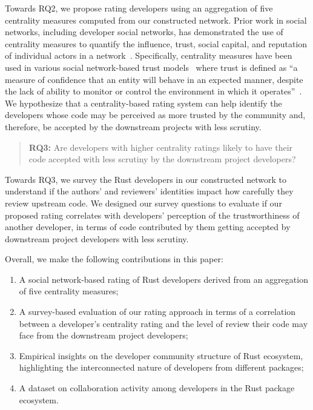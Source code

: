 \documentclass[10pt,journal,compsoc]{IEEEtran}
\begin{document}
Towards RQ2, we propose rating developers using an aggregation of five centrality measures computed from our constructed network. Prior work in social networks, including developer social networks, has demonstrated the use of centrality measures to quantify the influence, trust, social capital, and reputation of individual actors in a network~\cite{bosu2014impact, asim2019trust}. Specifically, centrality measures have been used in various social network-based trust models~\cite{asim2019trust, ceolin2017social, meo2017using, zahi2020improved, csimcsek2020combined} where trust is defined as ``a measure of confidence that an entity will behave in an expected manner, despite the lack of ability to monitor or control the environment in which it operates''~\cite{sherchan2013survey,singh2007privacy}. We hypothesize that a centrality-based rating system can help identify the developers whose code may be perceived as more trusted by the community and, therefore, be accepted by the downstream projects with less scrutiny.

\begin{quote}
    \textbf{RQ3:} Are developers with higher centrality ratings likely to have their code accepted with less scrutiny by the downstream project developers?
\end{quote}

Towards RQ3, we survey the Rust developers in our constructed network to understand if the authors' and reviewers' identities impact how carefully they review upstream code. We designed our survey questions to evaluate if our proposed rating correlates with developers' perception of the trustworthiness of another developer, in terms of code contributed by them getting accepted by downstream project developers with less scrutiny.


Overall, we make the following contributions in this paper:
\begin{enumerate}
    
    
    \item A social network-based rating of Rust developers derived from an aggregation of five centrality measures;
    \item A survey-based evaluation of our rating approach in terms of a correlation between a developer's centrality rating and the level of review their code may face from the downstream project developers;
    \item Empirical insights on the developer community structure of Rust ecosystem, highlighting the interconnected nature of developers from different packages;
    \item A dataset on collaboration activity among developers in the Rust package ecosystem.
\end{enumerate}
\end{document}
